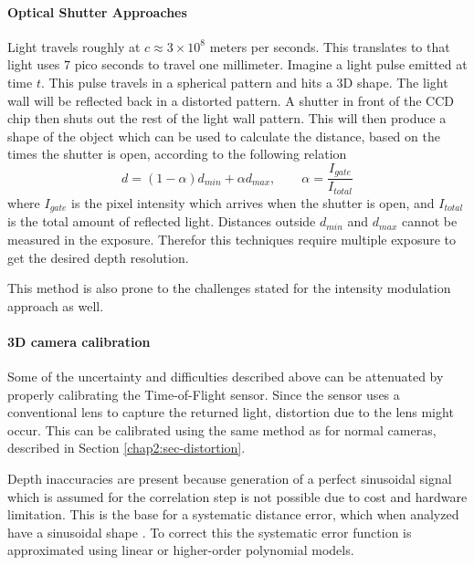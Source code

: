 \paragraph{Optical Shutter Approaches}
Light travels roughly at $c \approx 3 \times 10^8$ meters per seconds. This translates to
that light uses $7$ pico seconds to travel one millimeter. Imagine a light pulse emitted
at time $t$. This pulse travels in a spherical pattern and hits a 3D shape. The light wall
will be reflected back in a distorted pattern.\cite{optical-shutter} 
A shutter in front of the CCD chip then
shuts out the rest of the light wall pattern. This will then produce a shape of the object
which can be used to calculate the distance, based on the times the shutter is open,
according to the following relation \cite{time-of-flight-comp-graphics}
\begin{equation}
    d = (1 - \alpha) d_{min} + \alpha d_{max}, \quad \quad \alpha =
    \frac{I_{gate}}{I_{total}}
\end{equation}
where $I_{gate}$ is the pixel intensity which arrives when the shutter is open, and
$I_{total}$ is the total amount of reflected light. Distances outside $d_{min}$ and
$d_{max}$ cannot be measured in the exposure. Therefor this techniques require multiple
exposure to get the desired depth resolution. 

This method is also prone to the challenges stated for the intensity modulation approach
as well.

\paragraph{3D camera calibration}
Some of the uncertainty and difficulties described above can be attenuated by properly
calibrating the Time-of-Flight sensor. Since the sensor uses a conventional lens to
capture the returned light, distortion due to the lens might occur. This can be calibrated
using the same method as for normal cameras, described in Section
\ref{chap2:sec-distortion}. 

Depth inaccuracies are present because generation of a perfect sinusoidal signal which is
assumed for the correlation step is not possible due to cost and hardware limitation. This
is the base for a systematic distance error, which when analyzed have a sinusoidal shape
\cite{tof-calibration}. To correct this the systematic error function is approximated
using linear or higher-order polynomial models. 





